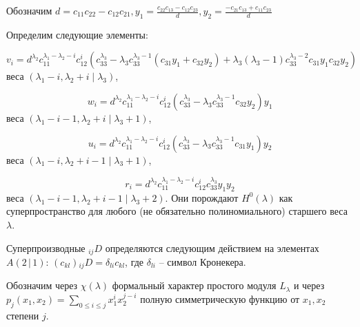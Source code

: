 Обозначим $d = c_{11} c_{22} - c_{12} c_{21}, y_1 = \frac{c_{22} c_{13} - c_{12} c_{23}}{d}, y_2 = \frac{-c_{21} c_{13} + c_{11} c_{23}}{d}$

Определим следующие элементы:

$$ v_i = d^{\lambda_2} c_{11}^{\lambda_1 - \lambda_2 - i} c_{12}^i (c_{33}^{\lambda_3} - \lambda_3 c_{33}^{\lambda_3 - 1} (c_{31} y_1 + c_{32} y_2) + \lambda_3 (\lambda_3 - 1) c_{33}^{\lambda_3 - 2} c_{31} y_1 c_{32} y_2) $$ 
веса $(\lambda_1 - i, \lambda_2 + i\mid\lambda_3)$,

$$ w_i = d^{\lambda_2} c_{11}^{\lambda_1 - \lambda_2 - i} c_{12}^i (c_{33}^{\lambda_3} - \lambda_3 c_{33}^{\lambda_3 - 1} c_{32} y_2) y_1 $$ 
веса $(\lambda_1 - i - 1, \lambda_2 + i\mid\lambda_3 + 1)$,

$$ u_i = d^{\lambda_2} c_{11}^{\lambda_1 - \lambda_2 - i} c_{12}^i (c_{33}^{\lambda_3} - \lambda_3 c_{33}^{\lambda_3 - 1} c_{31} y_1) y_2 $$ 
веса $(\lambda_1 - i, \lambda_2 + i - 1\mid\lambda_3 + 1)$,

$$ r_i = d^{\lambda_2} c_{11}^{\lambda_1 - \lambda_2 - i} c_{12}^i c_{33}^{\lambda_3} y_1 y_2 $$ 
веса $(\lambda_1 - i - 1, \lambda_2 + i - 1\mid\lambda_3 + 2)$. Они порождают $H^0 (\lambda)$ как суперпространство для любого (не обязательно полиномиального) старшего веса $\lambda$.

Суперпроизводные $_{ij}D$ определяются следующим действием на элементах $A(2 \,|\, 1)$: $ (c_{kl}) {_{ij}D} = \delta_{li} c_{kl} $, где $\delta_{li}$ -- символ Кронекера.

Обозначим через $\chi(\lambda)$ формальный характер простого модуля $L_{\lambda}$ и через $p_j (x_1, x_2) = \sum\limits_{0 \leq i \leq j} x_1^{i} x_2^{j - i}$ полную симметрическую функцию от $x_1, x_2$ степени $j$.
